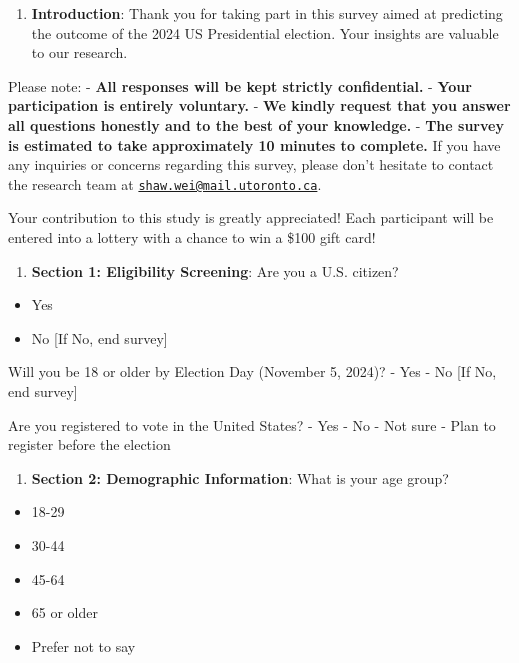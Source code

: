 \documentclass[
  letterpaper,
  DIV=11,
  numbers=noendperiod]{scrartcl}
\providecommand{\tightlist}{%
  \setlength{\itemsep}{0pt}\setlength{\parskip}{0pt}}\usepackage{longtable,booktabs,array}
\begin{document}
\begin{enumerate}
\def\labelenumi{\arabic{enumi}.}
\tightlist
\item
  \textbf{Introduction}: Thank you for taking part in this survey aimed
  at predicting the outcome of the 2024 US Presidential election. Your
  insights are valuable to our research.
\end{enumerate}

Please note: - \textbf{All responses will be kept strictly
confidential.} - \textbf{Your participation is entirely voluntary.} -
\textbf{We kindly request that you answer all questions honestly and to
the best of your knowledge.} - \textbf{The survey is estimated to take
approximately 10 minutes to complete.} If you have any inquiries or
concerns regarding this survey, please don't hesitate to contact the
research team at
\href{mailto:shaw.wei@mail.utoronto.ca}{\nolinkurl{shaw.wei@mail.utoronto.ca}}.

Your contribution to this study is greatly appreciated! Each participant
will be entered into a lottery with a chance to win a \$100 gift card!

\begin{enumerate}
\def\labelenumi{\arabic{enumi}.}
\setcounter{enumi}{1}
\tightlist
\item
  \textbf{Section 1: Eligibility Screening}: Are you a U.S. citizen?
\end{enumerate}

\begin{itemize}
\tightlist
\item
  Yes
\item
  No {[}If No, end survey{]}
\end{itemize}

Will you be 18 or older by Election Day (November 5, 2024)? - Yes - No
{[}If No, end survey{]}

Are you registered to vote in the United States? - Yes - No - Not sure -
Plan to register before the election

\begin{enumerate}
\def\labelenumi{\arabic{enumi}.}
\setcounter{enumi}{2}
\tightlist
\item
  \textbf{Section 2: Demographic Information}: What is your age group?
\end{enumerate}

\begin{itemize}
\tightlist
\item
  18-29
\item
  30-44
\item
  45-64
\item
  65 or older
\item
  Prefer not to say
\end{itemize}
\end{document}
